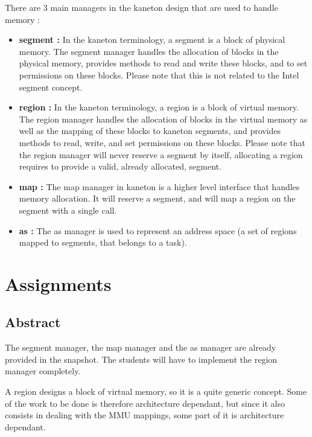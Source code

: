 There are 3 main managers in the kaneton design that are used to handle memory :

\begin{itemize}
\item \textbf{segment :} In the kaneton terminology, a segment is a block of physical memory. The segment manager handles the allocation of blocks in the physical memory, provides methods to read and write these blocks, and to set permissions on these blocks. Please note that this is not related to the Intel segment concept.

\item \textbf{region :} In the kaneton terminology, a region is a block of virtual memory. The region manager handles the allocation of blocks in the virtual memory as well as the mapping of these blocks to kaneton segments, and provides methods to read, write, and set permissions on these blocks. Please note that the region manager will never reserve a segment by itself, allocating a region requires to provide a valid, already allocated, segment.

\item \textbf{map :} The map manager in kaneton is a higher level interface that handles memory allocation. It will reserve a segment, and will map a region on the segment with a single call.

\item \textbf{as :} The as manager is used to represent an address space (a set of regions mapped to segments, that belongs to a task).

\end{itemize}

%
%

\section{Assignments}

\subsection*{Abstract}

The segment manager, the map manager and the as manager are already provided in the snapshot. The students will have to implement the region manager completely.

A region designs a block of virtual memory, so it is a quite generic concept. Some of the work to be done is therefore architecture dependant, but since it also consists in dealing with the MMU mappings, some part of it is architecture dependant.

